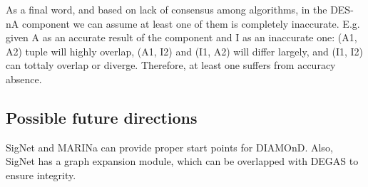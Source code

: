 As a final word, and based on lack of consensus among algorithms, in the DES-nA component we can assume at least one of them is completely inaccurate. E.g. given A as an accurate result of the component and I as an inaccurate one: (A1, A2) tuple will highly overlap, (A1, I2) and (I1, A2) will differ largely, and (I1, I2) can tottaly overlap or diverge. Therefore, at least one suffers from accuracy absence.

\subsection{Possible future directions}
SigNet and MARINa can provide proper start points for DIAMOnD. Also, SigNet has a graph expansion module, which can be overlapped with DEGAS to ensure integrity.
